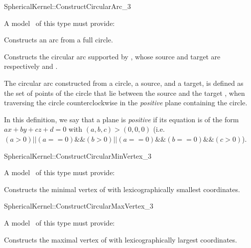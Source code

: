 \begin{ccRefFunctionObjectConcept}{SphericalKernel::ConstructCircularArc_3}

A model \ccVar\ of this type must provide:

{Constructs an arc from a full circle.}

{Constructs the circular arc supported by , whose source and target 
are respectively  and .
}

The circular arc constructed from a circle, a source, and a target, is
defined as the set of points of the circle that lie between the source
 and the target , when traversing the circle
counterclockwise in the \textit{positive} plane containing the circle.

In this definition, we say that a plane is \textit{positive} if its
equation is of the form $ax+by+cz+d=0$ with $(a,b,c)>(0,0,0)$
(i.e. $(a>0) || (a==0) \&\& (b>0) || (a==0)\&\&(b==0)\&\&(c>0)$).

\end{ccRefFunctionObjectConcept}
\begin{ccRefFunctionObjectConcept}{SphericalKernel::ConstructCircularMinVertex_3} 


A model \ccVar\ of this type must provide:


{Constructs the minimal vertex of  with lexicographically 
smallest coordinates.}

\end{ccRefFunctionObjectConcept}
\begin{ccRefFunctionObjectConcept}{SphericalKernel::ConstructCircularMaxVertex_3} 


A model \ccVar\ of this type must provide:


{Constructs the maximal vertex of  with lexicographically 
largest coordinates.}

\end{ccRefFunctionObjectConcept}
